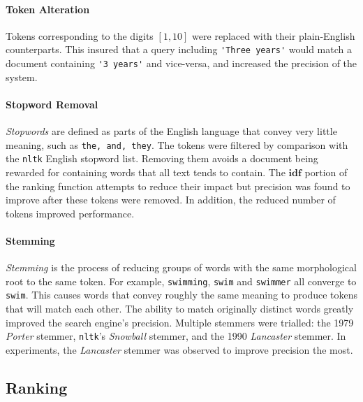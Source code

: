\documentclass[10pt, a4paper, twocolumn]{article}   	%
\begin{document}
\paragraph{Token Alteration}
Tokens corresponding to the digits $[1, 10]$ were replaced with their plain-English counterparts. This insured that a query including \verb|'Three years'| would match a document containing \verb|'3 years'| and vice-versa, and increased the precision of the system.

\paragraph{Stopword Removal}
\emph{Stopwords} are defined as parts of the English language that convey very little meaning, such as \verb|the, and, they|.
The tokens were filtered by comparison with the \verb|nltk| English stopword list. Removing them avoids a document being rewarded for containing words that all text tends to contain. The $\mathbf{idf}$ portion of the ranking function attempts to reduce their impact but precision was found to improve after these tokens were removed. In addition, the reduced number of tokens improved performance.

\paragraph{Stemming}
\emph{Stemming} is the process of reducing groups of words with the same morphological root to the same token. For example, \verb|swimming|, \verb|swim| and \verb|swimmer| all converge to \verb|swim|. This causes words that convey roughly the same meaning to produce tokens that will match each other. The ability to match originally distinct words greatly improved the search engine's precision. Multiple stemmers were trialled: the 1979 \emph{Porter} stemmer, \verb|nltk|'s \emph{Snowball} stemmer, and the 1990 \emph{Lancaster} stemmer. In experiments, the \emph{Lancaster} stemmer was observed to improve precision the most.

\subsection{Ranking}
\end{document}
